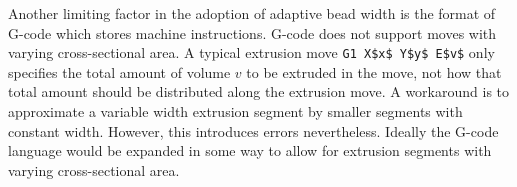 Another limiting factor in the adoption of adaptive bead width is the format of G-code which stores machine instructions.
G-code does not support moves with varying cross-sectional area.
A typical extrusion move \lstinline{G1 X$x$ Y$y$ E$v$} only specifies the total amount of volume $v$ to be extruded in the move, not how that total amount should be distributed along the extrusion move.
A workaround is to approximate a variable width extrusion segment by smaller segments with constant width.
However, this introduces errors nevertheless.
Ideally the G-code language would be expanded in some way to allow for extrusion segments with varying cross-sectional area.






